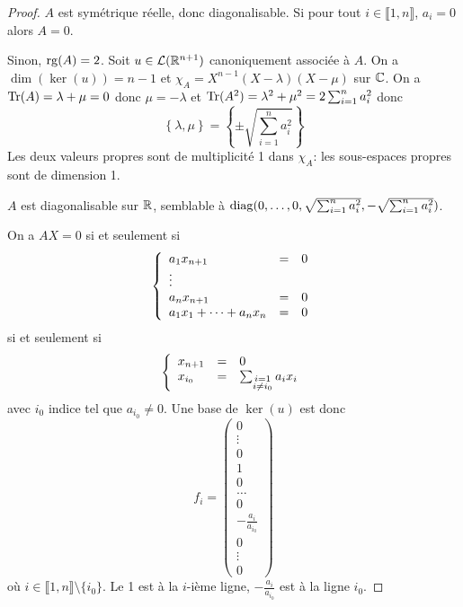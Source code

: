\documentclass[12pt]{article}
\begin{document}
\begin{proof}
	$A$ est symétrique réelle, donc diagonalisable. Si pour tout $i\in\llbracket1,n\rrbracket$, $a_{i}=0$ alors $A=0$.

	Sinon, $\operatorname{rg}(A)=2$. Soit $u\in\mathcal{L}(\mathbb{R}^{n+1})$ canoniquement associée à $A$. On a $\dim(\ker(u))=n-1$ et $\chi_{A}=X^{n-1}(X-\lambda)(X-\mu)$ sur $\mathbb{C}$. On a $\operatorname{Tr}(A)=\lambda+\mu=0$ donc $\mu=-\lambda$ et $\operatorname{Tr}(A^{2})=\lambda^{2}+\mu^{2}=2\sum_{i=1}^{n}a_{i}^{2}$ donc 
	\begin{equation}
		\left\lbrace\lambda,\mu\right\rbrace=\left\lbrace\pm\sqrt{\sum_{i=1}^{n}a_{i}^{2}}\right\rbrace
	\end{equation}
	Les deux valeurs propres sont de multiplicité 1 dans $\chi_{A}$: les sous-espaces propres sont de dimension 1.

	$A$ est diagonalisable sur $\mathbb{R}$, semblable à $\operatorname{diag}(0,\dots,0,\sqrt{\sum_{i=1}^{n}a_{i}^{2}},-\sqrt{\sum_{i=1}^{n}a_{i}^{2}})$.

	On a $AX=0$ si et seulement si 
	\begin{equation}
		\left\lbrace
			\begin{array}[]{lll}
				a_{1}x_{n+1}&=&0\\
				\vdots\\
				a_{n}x_{n+1}&=&0\\
				a_{1}x_{1}+\dots+a_{n}x_{n}&=&0
			\end{array}
		\right.
	\end{equation}
	si et seulement si 
	\begin{equation}
		\left\lbrace
			\begin{array}[]{lll}
				x_{n+1}&=&0\\
				x_{i_{0}}&=&\sum_{\substack{i=1\\ i\neq i_{0}}}a_{i}x_{i}
			\end{array}
		\right.
	\end{equation}
	avec $i_{0}$ indice tel que $a_{i_{0}}\neq0$. Une base de $\ker(u)$ est donc 
	\begin{equation}
		f_{i}=\begin{pmatrix}
			0\\
			\vdots\\
			0\\
			1\\
			0\\
			\dots\\
			0\\
			-\frac{a_{i}}{a_{i_{0}}}\\
			0\\
			\vdots\\
			0
		\end{pmatrix}
	\end{equation}
	où $i\in\llbracket1,n\rrbracket\setminus\lbrace i_{0}\rbrace$. Le 1 est à la $i$-ième ligne, $-\frac{a_{i}}{a_{i_{0}}}$ est à la ligne $i_{0}$.


\end{proof}
\end{document}
